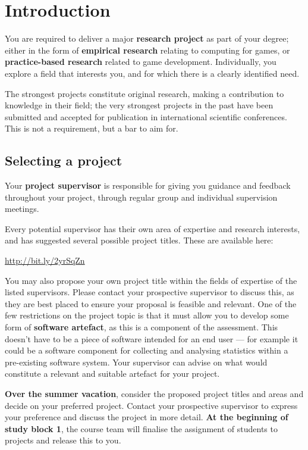 \chapter{Introduction}

You are required to deliver a major \textbf{research project} as part of your degree;
either in the form of \textbf{empirical research} relating to computing for games,
or \textbf{practice-based research} related to game development.
Individually, you explore a field that interests you, and for which there is a clearly identified need.

The strongest projects constitute original research, making a contribution to knowledge in their field;
the very strongest projects in the past have been submitted and accepted for publication in international
scientific conferences. This is not a requirement, but a bar to aim for.

\section*{Selecting a project}

Your \textbf{project supervisor} is responsible for giving you guidance and feedback throughout your project,
through regular group and individual supervision meetings.

Every potential supervisor has their own area of expertise and research interests,
and has suggested several possible project titles.
These are available here:

\url{http://bit.ly/2yrSqZn}

You may also propose your own project title within the fields of expertise of the listed supervisors.
Please contact your prospective supervisor to discuss this, as they are best placed to ensure your proposal
is feasible and relevant.
One of the few restrictions on the project topic is that it must allow you to develop some form of \textbf{software artefact},
as this is a component of the assessment.
This doesn't have to be a piece of software intended for an end user ---
for example it could be a software component for collecting and analysing statistics within a pre-existing software system.
Your supervisor can advise on what would constitute a relevant and suitable artefact for your project.

\textbf{Over the summer vacation}, consider the proposed project titles and areas and decide on your preferred project.
Contact your prospective supervisor to express your preference and discuss the project in more detail.
\textbf{At the beginning of study block 1}, the course team will finalise the assignment of students to projects
and release this to you.

